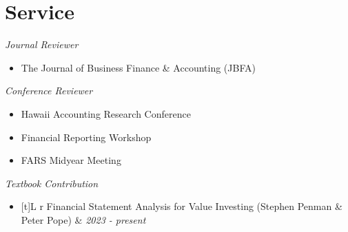 \section{Service}
  \resumeSubHeadingListStart
    \vspace{2mm}
    \item \noindent\textit{\footnotesize{Journal Reviewer}}
    \vspace{-1mm}
    \begin{itemize}[leftmargin=3ex,labelsep=1.2mm,topsep=0mm]
      \renewcommand{\labelitemi}{\normalfont\footnotesize\textendash}
      \item \footnotesize{The Journal of Business Finance \& Accounting (JBFA)}
    \end{itemize}

    \vspace{1mm}

    \noindent\textit{\footnotesize{Conference Reviewer}}
    \vspace{-1mm}
    \begin{itemize}[leftmargin=3ex,labelsep=1.2mm,topsep=0mm]
      \renewcommand{\labelitemi}{\normalfont\footnotesize\textendash}
      \item \footnotesize{Hawaii Accounting Research Conference}
      \item \footnotesize{Financial Reporting Workshop}
      \item \footnotesize{FARS Midyear Meeting}
    \end{itemize}

    \vspace{1mm}

    \noindent\textit{\footnotesize{Textbook Contribution}}
    \vspace{-1mm}
    \begin{itemize}[leftmargin=3ex,labelsep=1.2mm,topsep=0mm]
      \renewcommand{\labelitemi}{\normalfont\footnotesize\textendash}
      \item \begin{tabularx}{\linewidth}[t]{L r}
        \footnotesize{Financial Statement Analysis for Value Investing (Stephen Penman \& Peter Pope)} & \textit{\footnotesize{2023 - present}}
      \end{tabularx}
    \end{itemize}
  \resumeSubHeadingListEnd

